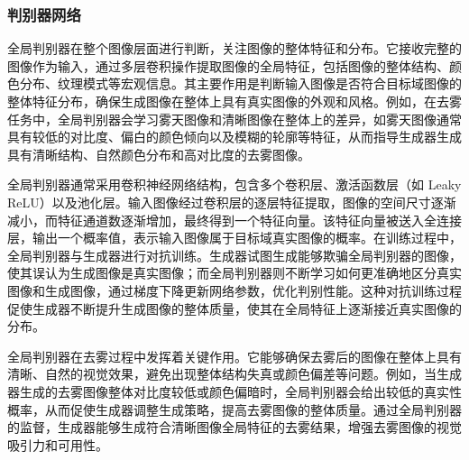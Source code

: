 \subsubsection{判别器网络}

全局判别器在整个图像层面进行判断，关注图像的整体特征和分布。它接收完整的图像作为输入，通过多层卷积操作提取图像的全局特征，包括图像的整体结构、颜色分布、纹理模式等宏观信息。其主要作用是判断输入图像是否符合目标域图像的整体特征分布，确保生成图像在整体上具有真实图像的外观和风格。例如，在去雾任务中，全局判别器会学习雾天图像和清晰图像在整体上的差异，如雾天图像通常具有较低的对比度、偏白的颜色倾向以及模糊的轮廓等特征，从而指导生成器生成具有清晰结构、自然颜色分布和高对比度的去雾图像。

全局判别器通常采用卷积神经网络结构，包含多个卷积层、激活函数层（如 Leaky ReLU）以及池化层。输入图像经过卷积层的逐层特征提取，图像的空间尺寸逐渐减小，而特征通道数逐渐增加，最终得到一个特征向量。该特征向量被送入全连接层，输出一个概率值，表示输入图像属于目标域真实图像的概率。在训练过程中，全局判别器与生成器进行对抗训练。生成器试图生成能够欺骗全局判别器的图像，使其误认为生成图像是真实图像；而全局判别器则不断学习如何更准确地区分真实图像和生成图像，通过梯度下降更新网络参数，优化判别性能。这种对抗训练过程促使生成器不断提升生成图像的整体质量，使其在全局特征上逐渐接近真实图像的分布。

\begin{figure}[htb]
    \centering
    \captionsetup{font=footnotesize}
    \label{fig:discriminator}
\end{figure}


全局判别器在去雾过程中发挥着关键作用。它能够确保去雾后的图像在整体上具有清晰、自然的视觉效果，避免出现整体结构失真或颜色偏差等问题。例如，当生成器生成的去雾图像整体对比度较低或颜色偏暗时，全局判别器会给出较低的真实性概率，从而促使生成器调整生成策略，提高去雾图像的整体质量。通过全局判别器的监督，生成器能够生成符合清晰图像全局特征的去雾结果，增强去雾图像的视觉吸引力和可用性。



